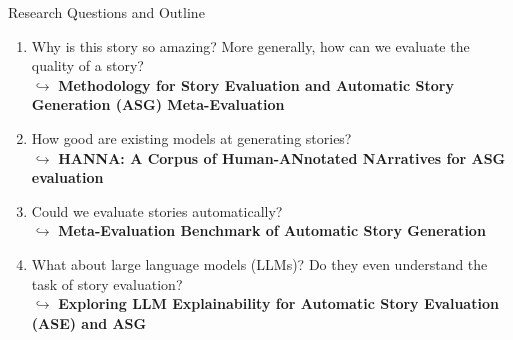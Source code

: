 \begin{noheadline}
\begin{frame}{Research Questions and Outline}
\begin{enumerate}[<+(1)->]
    \item Why is this story so amazing? More generally, how can we evaluate the quality of a story?\\
    $\hookrightarrow$ \textbf{Methodology for Story Evaluation and Automatic Story Generation (ASG) Meta-Evaluation}
    \item How good are existing models at generating stories?\\
    $\hookrightarrow$ \textbf{HANNA: A Corpus of Human-ANnotated NArratives for ASG evaluation}
    \item Could we evaluate stories automatically?\\
    $\hookrightarrow$ \textbf{Meta-Evaluation Benchmark of Automatic Story Generation}
    \item What about large language models (LLMs)? Do they even understand the task of story evaluation?\\
    $\hookrightarrow$ \textbf{Exploring LLM Explainability for Automatic Story Evaluation (ASE) and ASG}
\end{enumerate}
\end{frame}

\end{noheadline}